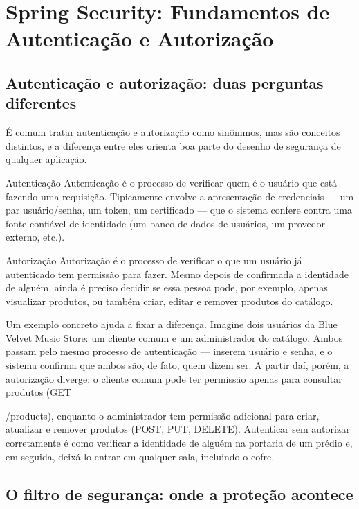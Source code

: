 \chapter{Spring Security: Fundamentos de Autenticação e Autorização}

\section{Autenticação e autorização: duas perguntas diferentes}

É comum tratar autenticação e autorização como sinônimos, mas são conceitos distintos, e a diferença entre eles orienta boa parte do desenho de segurança de qualquer aplicação.

\begin{infobox}{Autenticação}
Autenticação é o processo de verificar quem é o usuário que está fazendo uma requisição. Tipicamente envolve a apresentação de credenciais — um par usuário/senha, um token, um certificado — que o sistema confere contra uma fonte confiável de identidade (um banco de dados de usuários, um provedor externo, etc.).
\end{infobox}

\begin{infobox}{Autorização}
Autorização é o processo de verificar o que um usuário já autenticado tem permissão para fazer. Mesmo depois de confirmada a identidade de alguém, ainda é preciso decidir se essa pessoa pode, por exemplo, apenas visualizar produtos, ou também criar, editar e remover produtos do catálogo.
\end{infobox}

Um exemplo concreto ajuda a fixar a diferença. Imagine dois usuários da Blue Velvet Music Store: um cliente comum e um administrador do catálogo. Ambos passam pelo mesmo processo de autenticação — inserem usuário e senha, e o sistema confirma que ambos são, de fato, quem dizem ser. A partir daí, porém, a autorização diverge: o cliente comum pode ter permissão apenas para consultar produtos (GET

/products), enquanto o administrador tem permissão adicional para criar, atualizar e remover produtos (POST, PUT, DELETE). Autenticar sem autorizar corretamente é como verificar a identidade de alguém na portaria de um prédio e, em seguida, deixá-lo entrar em qualquer sala, incluindo o cofre.

\section{O filtro de segurança: onde a proteção acontece}

